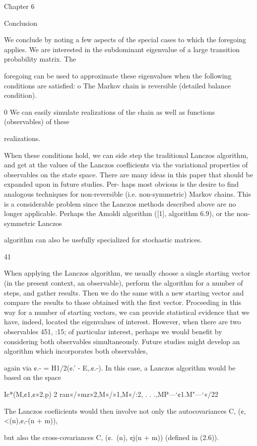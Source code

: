 Chapter 6

Conclusion

We conclude by noting a few aspects of the special cases to which the foregoing applies.
We are interested in the subdominant eigenvalue of a large transition probability matrix. The

foregoing can be used to approximate these eigenvalues when the following conditions are satisﬁed:
o The Markov chain is reversible (detailed balance condition).

0 We can easily simulate realizations of the chain as well as functions (observables) of these

realizations.

When these conditions hold, we can side step the traditional Lanczos algorithm, and get at the
values of the Lanczos coeﬂicients via the variational properties of observables on the state space.
There are many ideas in this paper that should be expanded upon in future studies. Per-
haps most obvious is the desire to ﬁnd analogous techniques for non-reversible (i.e. non-symmetric)
Markov chains. This is a considerable problem since the Lanczos methods described above are no
longer applicable. Perhaps the Amoldi algorithm ([1], algorithm 6.9), or the non-symmetric Lanczos

algorithm can also be usefully specialized for stochastic matrices.

41

When applying the Lanczos algorithm, we usually choose a single starting vector (in the
present context, an observable), perform the algorithm for a number of steps, and gather results.
Then we do the same with a new starting vector and compare the results to those obtained with
the ﬁrst vector. Proceeding in this way for a number of starting vectors, we can provide statistical
evidence that we have, indeed, located the eigenvalues of interest. However, when there are two
observables 451, :15; of particular interest, perhaps we would beneﬁt by considering both observables
simultaneously. Future studies might develop an algorithm which incorporates both observables,

again via ¢.- = H1/2(¢.' - E,.¢.-). In this case, a Lanczos algorithm would be based on the space

Ic*(M,¢1,¢»2.p) 2 ran{«/»mz»2,M«/»1,M«/:2, . . .,MP—‘¢1.M"—‘«/22}

The Lanczos coeﬁicients would then involve not only the autocovariances C, (¢,<(n),¢,-(n + m)),

but also the cross-covariances C, (¢.~(n), ¢j(n + m)) (deﬁned in (2.6)).
